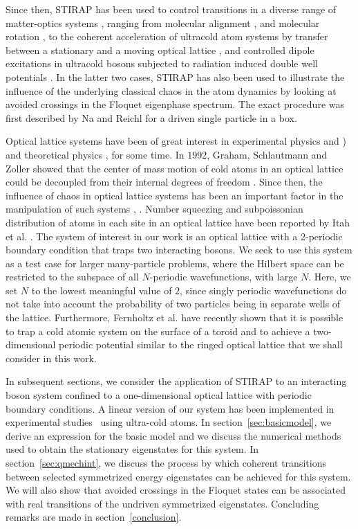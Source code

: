 \documentclass{article}
\begin{document}
Since then, STIRAP has been used to control transitions in a diverse range of matter-optics systems \cite{stirap:review}, ranging from molecular alignment \cite{stirap:molecular}, and molecular rotation \cite{na-reichl:mol-rot}, to the coherent acceleration of ultracold atom systems by transfer between a stationary and a moving optical lattice \cite{holder:reichl:2res}, and controlled dipole excitations in ultracold bosons subjected to radiation induced double well potentials  \cite{roy:reichl:dblwell}. In the latter  two cases, STIRAP has also been used to illustrate the influence of the underlying classical chaos in the atom dynamics by looking at avoided crossings in the Floquet eigenphase spectrum. The exact procedure was first described by Na and Reichl  \cite{na-reichl:pbox} for a driven single particle in a box.

Optical lattice systems have been of great interest in experimental physics \cite{oplattice:oldexpt} and \cite{oplattice:oldexpt2}) and theoretical physics \cite{oplattice:oldtheory}, \cite{oplattice:oldtheory2} for some time. In $1992$, Graham, Schlautmann and Zoller showed that the center of mass motion of cold atoms in an optical lattice could be decoupled from their internal degrees of freedom  \cite{graham}.  Since then, the influence of chaos in optical lattice systems has been  an important factor in the manipulation of such systems   \cite{holder:reichl:2res}, \cite{raizen:oplattice}. Number squeezing and subpoissonian distribution of atoms in each site in an optical lattice have been reported by Itah et al.  \cite{technion:oplattice-culling}. The system of interest in our work is an optical lattice with a 2-periodic boundary condition that traps two interacting bosons. We seek to use this system as a test case for larger many-particle problems, where the Hilbert space can be restricted to the subspace of all $N$-periodic wavefunctions, with large $N$. Here, we set $N$ to the lowest meaningful value of $2$, since singly periodic wavefunctions do not take into account the probability of two particles being in separate wells of the lattice. Furthermore, Fernholtz et al.  \cite{fernholtz} have recently  shown that it is possible to trap a cold atomic system on the surface of a toroid and to achieve a two-dimensional periodic potential similar to the ringed optical lattice that we shall consider in this work. 

In subsequent sections, we consider the application of STIRAP to an interacting boson system confined to a one-dimensional optical lattice with periodic boundary conditions.   A linear version of our system has been implemented in  experimental studies~\cite{steck} using ultra-cold atoms. In section~\ref{sec:basicmodel}, we  derive an expression for the basic model and we  discuss the numerical methods used to obtain the stationary eigenstates for this system.  In section~\ref{sec:qmechint}, we discuss the process by which coherent transitions between selected symmetrized energy eigenstates can be achieved for this system.  We will also show that avoided crossings in the Floquet states can be associated with real transitions of the undriven symmetrized eigenstates. Concluding remarks are made in section~\ref{conclusion}.
\end{document}
